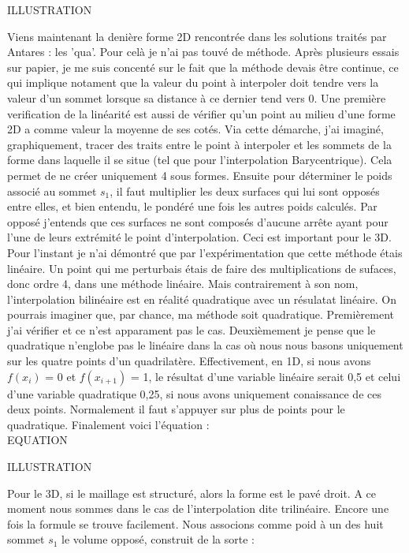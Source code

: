 ILLUSTRATION

Viens maintenant la denière forme 2D rencontrée dans les solutions traités par Antares : les 'qua'. Pour celà je n'ai pas touvé de méthode. Après plusieurs essais sur papier, je me suis concenté sur le fait que la méthode devais être continue, ce qui implique notament que la valeur du point à interpoler doit tendre vers la valeur d'un sommet lorsque sa distance à ce dernier tend vers 0. Une première verification de la linéarité est aussi de vérifier qu'un point au milieu d'une forme 2D a comme valeur la moyenne de ses cotés.
Via cette démarche, j'ai imaginé, graphiquement, tracer des traits entre le point à interpoler et les sommets de la forme dans laquelle il se situe (tel que pour l'interpolation Barycentrique). Cela permet de ne créer uniquement 4 sous formes. Ensuite pour déterminer le poids associé au sommet \( s_1 \), il faut multiplier les deux surfaces qui lui sont opposés entre elles, et bien entendu, le pondéré une fois les autres poids calculés. Par opposé j'entends que ces surfaces ne sont composés d'aucune arrête ayant pour l'une de leurs extrémité le point d'interpolation. Ceci est important pour le 3D. Pour l'instant je n'ai démontré que par l'expérimentation que cette méthode étais linéaire. Un point qui me perturbais étais de faire des multiplications de sufaces, donc ordre 4, dans une méthode linéaire. Mais contrairement à son nom, l'interpolation bilinéaire est en réalité quadratique avec un résulatat linéaire. On pourrais imaginer que, par chance, ma méthode soit quadratique. Premièrement j'ai vérifier et ce n'est apparament pas le cas. Deuxièmement je pense que le quadratique n'englobe pas le linéaire dans la cas où nous nous basons uniquement sur les quatre points d'un quadrilatère. Effectivement, en 1D, si nous avons \(f(x_i)\) = 0 et \(f(x_{i+1})\) = 1, le résultat d'une variable linéaire serait 0,5 et celui d'une variable quadratique 0,25, si nous avons uniquement conaissance de ces deux points. Normalement il faut s'appuyer sur plus de points pour le quadratique. Finalement voici l'équation :\\
EQUATION

ILLUSTRATION\vspace{0.5cm}  %

Pour le 3D, si le maillage est structuré, alors la forme est le pavé droit. A ce moment nous sommes dans le cas de l'interpolation dite trilinéaire. Encore une fois la formule se trouve facilement. Nous associons comme poid à un des huit sommet \( s_1 \) le volume opposé, construit de la sorte :

